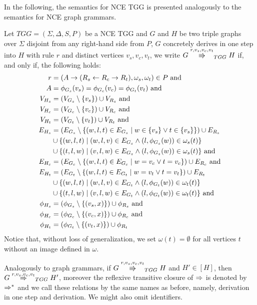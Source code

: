 \documentclass[]{report}
\begin{document}
In the following, the semantics for NCE TGG is presented analogously to the semantics for NCE graph grammars.

\begin{definition}
	\label{def:tgg_dstep}
	Let $TGG = (\Sigma, \Delta, S, P)$ be a NCE TGG and $G$ and $H$ be two triple graphs over $\Sigma$ disjoint from any right-hand side from $P$, $G$ concretely derives in one step into $H$ with rule $r$ and distinct vertices $v_s, v_c, v_t$, we write $G \tcderiv{r}{v_s,v_c,v_t}{TGG} H$ if, and only if, the following holds:
	\begin{align*}
		r & = (A \to (R_s \overset{}{\leftarrow} R_c \overset{}{\rightarrow} R_t), \omega_s, \omega_t) \in P \text{ and } \\
		A & = \phi_{G_s}(v_s) = \phi_{G_c}(v_c) = \phi_{G_t}(v_t) \text{ and}\\
		V_{H_s}  & = (V_{G_s} \setminus \{v_s\}) \cup V_{R_s} \text{ and}\\
		V_{H_c}  & = (V_{G_c} \setminus \{v_c\}) \cup V_{R_c} \text{ and}\\
		V_{H_t}  & = (V_{G_t} \setminus \{v_t\}) \cup V_{R_t} \text{ and}\\
		E_{H_s} & = (E_{G_s} \setminus \{(w,l,t) \in E_{G_s} \; | \; w \in \{v_s\} \lor t \in \{v_s\} \}) \cup E_{R_s} \\
		& \cup \{(w,l,t) \; | \; (w,l,v) \in E_{G_s} \land (l,\phi_{G_s}(w)) \in \omega_{s}(t)\} \\
		& \cup \{(t,l,w) \; | \; (v,l,w) \in E_{G_s} \land (l,\phi_{G_s}(w)) \in \omega_{s}(t)\} \text{ and} \\
		E_{H_c} & = (E_{G_c} \setminus \{(w,l,t) \in E_{G_c} \; | \; w = v_c \lor t = v_c \}) \cup E_{R_c} \text{ and} \\
		E_{H_t} & = (E_{G_t} \setminus \{(w,l,t) \in E_{G_t} \; | \; w = v_t \lor t = v_t \}) \cup E_{R_t} \\
		& \cup \{(w,l,t) \; | \; (w,l,v) \in E_{G_t} \land (l,\phi_{G_t}(w)) \in \omega_{t}(t)\} \\
		& \cup \{(t,l,w) \; | \; (v,l,w) \in E_{G_t} \land (l,\phi_{G_t}(w)) \in \omega_{t}(t)\} \text{ and} \\
		\phi_{H_s} & = (\phi_{G_s} \setminus \{(v_s,x)\}) \cup \phi_{R_s} \text{ and}\\
		\phi_{H_c} & = (\phi_{G_c} \setminus \{(v_c,x)\}) \cup \phi_{R_c} \text{ and}\\
		\phi_{H_t} & = (\phi_{G_t} \setminus \{(v_t,x)\}) \cup \phi_{R_t}\\
	\end{align*}
	Notice that, without loss of generalization, we set $\omega(t) = \emptyset$ for all vertices $t$ without an image defined in $\omega$.
	
	Analogously to graph grammars, if $G \cderiv{r}{v_s,v_c,v_t}{TGG} H$ and $H' \in [H]$, then $G \tderiv{r}{v_s,v_c,v_t}{TGG} H'$, moreover the reflexive transitive closure of $\tderiv{}{}{}$ is denoted by $\tderivtr{}{}{}$ and we call these relations by the same names as before, namely, derivation in one step and derivation. We might also omit identifiers.
\end{definition}
\end{document}
